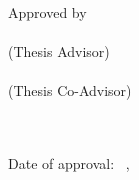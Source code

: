 \clearpage
\thispagestyle{empty}

\begin{center}
	\MakeUppercase{\textbf{\thesistitle}} \\
\end{center}


\vfill
{Approved by} \\
[3\baselineskip]

\advisor \dotfill \\
(Thesis Advisor) \\[\baselineskip]

\coadvisor \dotfill \\
(Thesis Co-Advisor) \\[\baselineskip]

\domjurya \dotfill \\[2\baselineskip]
\domjuryb \dotfill \\[2\baselineskip]

\vfill

Date of approval:  \month~\day,~\year

\clearpage
